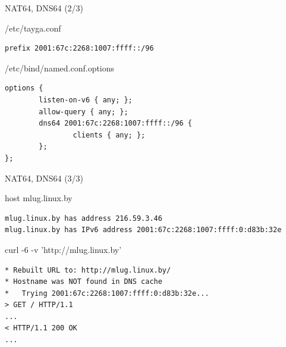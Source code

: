 \documentclass[aspectratio=169]{beamer}
\begin{document}
{
\begin{frame}[plain]{}
\end{frame}
}

\begin{frame}[fragile]{NAT64, DNS64 (2/3)}
\begin{block}{/etc/tayga.conf}
\begin{verbatim}
prefix 2001:67c:2268:1007:ffff::/96
\end{verbatim}
\end{block}

\begin{block}{/etc/bind/named.conf.options}
\end{block}
\begin{verbatim}
options {
        listen-on-v6 { any; };
        allow-query { any; };
        dns64 2001:67c:2268:1007:ffff::/96 {
                clients { any; };
        };
};
\end{verbatim}
\end{frame}

\begin{frame}[fragile]{NAT64, DNS64 (3/3)}
\begin{block}{host mlug.linux.by}
\begin{verbatim}
mlug.linux.by has address 216.59.3.46
mlug.linux.by has IPv6 address 2001:67c:2268:1007:ffff:0:d83b:32e
\end{verbatim}
\end{block}

\begin{block}{curl -6 -v 'http://mlug.linux.by'}
\begin{verbatim}
* Rebuilt URL to: http://mlug.linux.by/
* Hostname was NOT found in DNS cache
*   Trying 2001:67c:2268:1007:ffff:0:d83b:32e...
> GET / HTTP/1.1
... 
< HTTP/1.1 200 OK
...
\end{verbatim}
\end{block}
\end{frame}
\end{document}
